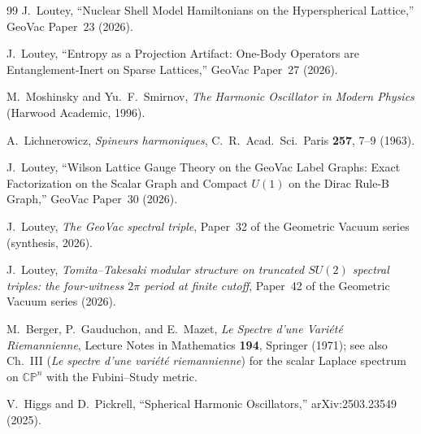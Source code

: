 \documentclass[twocolumn,pra,amsmath,amssymb,superscriptaddress]{revtex4-2}
\begin{document}
\begin{thebibliography}{99}
J.~Loutey,
``Nuclear Shell Model Hamiltonians on the Hyperspherical Lattice,''
GeoVac Paper~23 (2026).

J.~Loutey,
``Entropy as a Projection Artifact: One-Body Operators are
Entanglement-Inert on Sparse Lattices,''
GeoVac Paper~27 (2026).

M.~Moshinsky and Yu.~F.~Smirnov,
\emph{The Harmonic Oscillator in Modern Physics}
(Harwood Academic, 1996).

A.~Lichnerowicz,
\textit{Spineurs harmoniques},
C.~R.\ Acad.\ Sci.\ Paris \textbf{257}, 7--9 (1963).

J.~Loutey,
``Wilson Lattice Gauge Theory on the GeoVac Label Graphs: Exact
Factorization on the Scalar Graph and Compact $U(1)$ on the Dirac
Rule-B Graph,''
GeoVac Paper~30 (2026).

J.~Loutey,
\textit{The GeoVac spectral triple}, Paper~32 of the Geometric
Vacuum series (synthesis, 2026).

J.~Loutey,
\textit{Tomita--Takesaki modular structure on truncated $SU(2)$
spectral triples: the four-witness $2\pi$ period at finite cutoff},
Paper~42 of the Geometric Vacuum series (2026).

M.~Berger, P.~Gauduchon, and E.~Mazet,
\textit{Le Spectre d'une Vari\'et\'e Riemannienne},
Lecture Notes in Mathematics \textbf{194}, Springer (1971);
see also Ch.~III (\emph{Le spectre d'une vari\'et\'e riemannienne}) for the scalar Laplace spectrum on
$\mathbb{CP}^n$ with the Fubini--Study metric.

V.~Higgs and D.~Pickrell,
``Spherical Harmonic Oscillators,''
arXiv:2503.23549 (2025).

\end{thebibliography}
\end{document}
